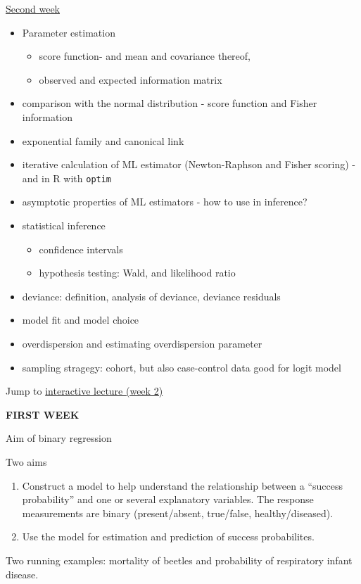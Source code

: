 \documentclass[
  ignorenonframetext,
]{beamer}
\providecommand{\tightlist}{%
  \setlength{\itemsep}{0pt}\setlength{\parskip}{0pt}}
\begin{document}
\begin{frame}[fragile]
\begin{block}{\protect\hyperlink{secondweek}{Second week}}
\protect\hypertarget{second-week}{}
\begin{itemize}
\tightlist
\item
  Parameter estimation

  \begin{itemize}
  \tightlist
  \item
    score function- and mean and covariance thereof,
  \item
    observed and expected information matrix
  \end{itemize}
\item
  comparison with the normal distribution - score function and Fisher
  information
\item
  exponential family and canonical link
\item
  iterative calculation of ML estimator (Newton-Raphson and Fisher
  scoring) - and in R with \texttt{optim}
\item
  asymptotic properties of ML estimators - how to use in inference?
\item
  statistical inference

  \begin{itemize}
  \tightlist
  \item
    confidence intervals
  \item
    hypothesis testing: Wald, and likelihood ratio
  \end{itemize}
\item
  deviance: definition, analysis of deviance, deviance residuals
\item
  model fit and model choice
\item
  overdispersion and estimating overdispersion parameter
\item
  sampling stragegy: cohort, but also case-control data good for logit
  model
\end{itemize}

Jump to \protect\hyperlink{ILw2}{interactive lecture (week 2)}

\textbf{FIRST WEEK}
\end{block}
\end{frame}

\begin{frame}{Aim of binary regression}
\protect\hypertarget{aim-of-binary-regression}{}
\begin{block}{Two aims}
\protect\hypertarget{two-aims}{}
\begin{enumerate}
\tightlist
\item
  Construct a model to help understand the relationship between a
  ``success probability'' and one or several explanatory variables. The
  response measurements are binary (present/absent, true/false,
  healthy/diseased).
\item
  Use the model for estimation and prediction of success probabilites.
\end{enumerate}

Two running examples: mortality of beetles and probability of
respiratory infant disease.
\end{block}
\end{frame}
\end{document}
